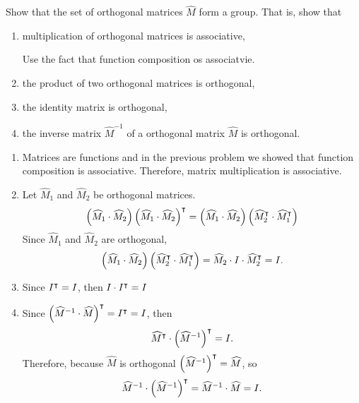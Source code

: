 \documentclass[newpage,hints,handout]{ximera}
\begin{document}
\begin{problem}
Show that the set of orthogonal matrices $\hat{M}$ form a group.  That
is, show that
\begin{enumerate}
\item multiplication of orthogonal matrices is associative, 
 	\begin{hint}
	Use the fact that function composition os associatvie. 
	\end{hint}
\item the product of two orthogonal matrices is orthogonal,
\item the identity matrix is orthogonal,
\item the inverse matrix $\hat{M}^{-1}$ of a orthogonal matrix $\hat{M}$ is orthogonal.
\end{enumerate}

\begin{freeResponse}
\begin{enumerate}
\item Matrices are functions and in the previous problem we showed that function composition is associative. Therefore, matrix multiplication is associative.

\item Let $\hat{M}_{1}$ and $\hat{M}_{2}$ be orthogonal matrices.
\[
\left( \widehat{M}_{1} \cdot \widehat{M}_{2} \right) \left( \widehat{M}_{1} \cdot \widehat{M}_{2} \right)^\intercal 
	= \left( \widehat{M}_{1} \cdot \widehat{M}_{2} \right) \left( \widehat{M}_{2}^\intercal \cdot \widehat{M}_{1}^\intercal \right)  
\]
Since $\hat{M}_{1}$ and $\hat{M}_{2}$ are orthogonal,
\[
\left( \widehat{M}_{1} \cdot \widehat{M}_{2} \right) \left( \widehat{M}_{2}^\intercal \cdot \widehat{M}_{1}^\intercal \right) 
	= \widehat{M}_{2} \cdot I \cdot \widehat{M}_{2}^\intercal = I.
\]

\item Since $ I^\intercal = I$, then $I \cdot I^\intercal = I$

\item Since $\left( \widehat{M}^{-1} \cdot \widehat{M} \right)^\intercal = I^\intercal = I$, then 
\[
\widehat{M}^\intercal \cdot \left( \widehat{M}^{-1} \right)^\intercal = I.
\]
Therefore, because $\hat{M}$ is orthogonal $\left( \widehat{M}^{-1} \right)^\intercal = \widehat{M}$, so
\[
\widehat{M}^{-1} \cdot \left( \widehat{M}^{-1} \right)^\intercal = \widehat{M}^{-1} \cdot \widehat{M} = I.
\]

\end{enumerate}
\end{freeResponse}

\end{problem}
\end{document}
